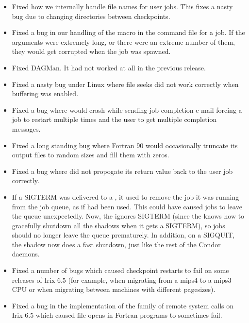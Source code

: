 \begin{itemize}

\item Fixed how we internally handle file names for user jobs. This
fixes a nasty bug due to changing directories between checkpoints.

\item Fixed a bug in our handling of the  macro in
the command file for a job. If the arguments were extremely long, or
there were an extreme number of them, they would get corrupted when the
job was spawned.

\item Fixed DAGMan. It had not worked at all in the previous release.

\item Fixed a nasty bug under Linux where file seeks did not work
correctly when buffering was enabled.

\item Fixed a bug where  would crash while sending job
completion e-mail forcing a job to restart multiple times and the user
to get multiple completion messages.

\item Fixed a long standing bug where Fortran 90 would occasionally
truncate its output files to random sizes and fill them with zeros.

\item Fixed a bug where  did not propogate its return
value back to the user job correctly.

\item If a SIGTERM was delivered to a , it used to
remove the job it was running from the job queue, as if 
had been used.
This could have caused jobs to leave the queue unexpectedly.
Now, the  ignores SIGTERM (since the 
knows how to gracefully shutdown all the shadows when it gets a
SIGTERM), so jobs should no longer leave the queue prematurely.
In addition, on a SIGQUIT, the shadow now does a fast shutdown, just
like the rest of the Condor daemons.

\item Fixed a number of bugs which caused checkpoint restarts
to fail on some releases of Irix 6.5 (for example, when migrating from
a mips4 to a mips3 CPU or when migrating between machines with
different pagesizes).

\item Fixed a bug in the implementation of the  family
of remote system calls on Irix 6.5 which caused file opens in Fortran
programs to sometimes fail.


\end{itemize}
